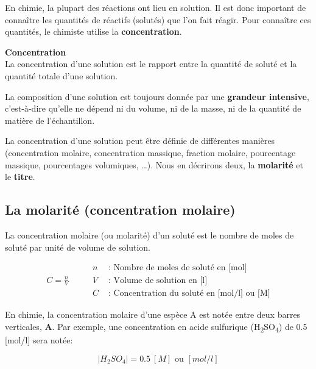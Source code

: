 \documentclass[
  11pt,
  a4paper,
  openany]{book}
\begin{document}
En chimie, la plupart des réactions ont lieu en solution. Il est donc important de connaître les quantités de réactifs (solutés) que l'on fait réagir. Pour connaître ces quantités, le chimiste utilise la \textbf{concentration}.

\begin{tcolorbox}
\textbf{Concentration}\\
La concentration d'une solution est le rapport entre la quantité de soluté et la quantité totale d'une solution.

\end{tcolorbox}

La composition d'une solution est toujours donnée par une \textbf{grandeur intensive}, c'est-à-dire qu'elle ne dépend ni du volume, ni de la masse, ni de la quantité de matière de l'échantillon.

La concentration d'une solution peut être définie de différentes manières (concentration molaire, concentration massique, fraction molaire, pourcentage massique, pourcentages volumiques, \ldots). Nous en décrirons deux, la \textbf{molarité} et le \textbf{titre}.

\hypertarget{la-molarituxe9-concentration-molaire}{%
\subsection{La molarité (concentration molaire)}\label{la-molarituxe9-concentration-molaire}}

La concentration molaire (ou molarité) d'un soluté est le nombre de moles de soluté par unité de volume de solution.

\[
\begin{split}
  C = \frac{n}{V}
\end{split}
\qquad
\begin{split}
  n &\text{ : Nombre de moles de soluté en [mol]} \\
  V &\text{ : Volume de solution en [l]} \\
  C &\text{ : Concentration du soluté en [mol/l] ou [M]}
\end{split}
\]

En chimie, la concentration molaire d'une espèce A est notée entre deux barres verticales, \textbf{\textbar A\textbar{}}. Par exemple, une concentration en acide sulfurique (H\textsubscript{2}SO\textsubscript{4}) de 0.5 {[}mol/l{]} sera notée:

\[ |H_2SO_4| = 0.5\ [M] \text{ ou } [mol/l] \]
\end{document}

